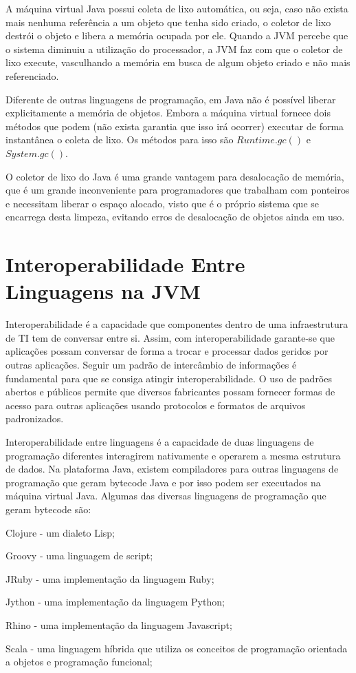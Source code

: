   A máquina virtual Java possui coleta de lixo automática, ou seja, caso não exista mais nenhuma referência a um objeto que tenha sido criado, o coletor de lixo destrói o objeto e libera a memória ocupada por ele. Quando a JVM percebe que o sistema diminuiu a utilização do processador, a JVM faz com que o coletor de lixo execute, vasculhando a memória em busca de algum objeto criado e não mais referenciado.

  Diferente de outras linguagens de programação, em Java não é possível liberar explicitamente a memória de objetos. Embora a máquina virtual fornece dois métodos que podem (não exista garantia que isso irá ocorrer) executar de forma instantânea o coleta de lixo. Os métodos para isso são $Runtime.gc()$ e $System.gc()$.

  O coletor de lixo do Java é uma grande vantagem para desalocação de memória, que é um grande inconveniente para programadores que trabalham com ponteiros e necessitam liberar o espaço alocado, visto que é o próprio sistema que se encarrega desta limpeza, evitando erros de desalocação de objetos ainda em uso.

  \section{Interoperabilidade Entre Linguagens na JVM}

  Interoperabilidade é a capacidade que componentes dentro de uma infraestrutura de \ac{TI} tem de conversar entre si. Assim, com interoperabilidade garante-se que aplicações possam conversar de forma a trocar e processar dados geridos por outras aplicações. Seguir um padrão de intercâmbio de informações é fundamental para que se consiga atingir interoperabilidade. O uso de padrões abertos e públicos permite que diversos fabricantes possam fornecer formas de acesso para outras aplicações usando protocolos e formatos de arquivos padronizados.

  Interoperabilidade entre linguagens é a capacidade de duas linguagens de programação diferentes interagirem nativamente e operarem a mesma estrutura de dados. Na plataforma Java, existem compiladores para outras linguagens de programação que geram bytecode Java e por isso podem ser executados na máquina virtual Java. Algumas das diversas linguagens de programação que geram bytecode são:

  \begin{compactitem}
    \item Clojure - um dialeto \ac{Lisp};
    \item Groovy - uma linguagem de script;
    \item JRuby - uma implementação da linguagem Ruby;
    \item Jython - uma implementação da linguagem Python;
    \item Rhino - uma implementação da linguagem Javascript;
    \item Scala - uma linguagem híbrida que utiliza os conceitos de programação orientada a objetos e programação funcional;
  \end{compactitem}
